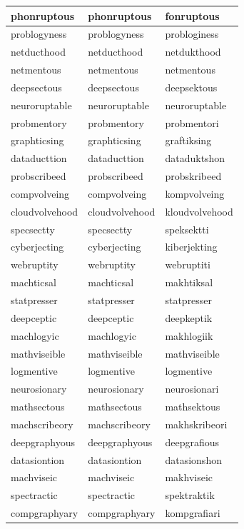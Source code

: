 \documentclass[10pt,twocolumn,letterpaper]{article}
\begin{document}
\begin{longtable}{|p{4cm}|p{4cm}|p{4cm}|}
phonruptous & phonruptous & fonruptous \\ \hline
problogyness & problogyness & probloginess \\ \hline
netducthood & netducthood & netdukthood \\ \hline
netmentous & netmentous & netmentous \\ \hline
deepsectous & deepsectous & deepsektous \\ \hline
neuroruptable & neuroruptable & neuroruptable \\ \hline
probmentory & probmentory & probmentori \\ \hline
graphticsing & graphticsing & graftiksing \\ \hline
dataducttion & dataducttion & dataduktshon \\ \hline
probscribeed & probscribeed & probskribeed \\ \hline
compvolveing & compvolveing & kompvolveing \\ \hline
cloudvolvehood & cloudvolvehood & kloudvolvehood \\ \hline
specsectty & specsectty & speksektti \\ \hline
cyberjecting & cyberjecting & kiberjekting \\ \hline
webruptity & webruptity & webruptiti \\ \hline
machticsal & machticsal & makhtiksal \\ \hline
statpresser & statpresser & statpresser \\ \hline
deepceptic & deepceptic & deepkeptik \\ \hline
machlogyic & machlogyic & makhlogiik \\ \hline
mathviseible & mathviseible & mathviseible \\ \hline
logmentive & logmentive & logmentive \\ \hline
neurosionary & neurosionary & neurosionari \\ \hline
mathsectous & mathsectous & mathsektous \\ \hline
machscribeory & machscribeory & makhskribeori \\ \hline
deepgraphyous & deepgraphyous & deepgrafious \\ \hline
datasiontion & datasiontion & datasionshon \\ \hline
machviseic & machviseic & makhviseic \\ \hline
spectractic & spectractic & spektraktik \\ \hline
compgraphyary & compgraphyary & kompgrafiari \\ \hline

\end{longtable}
\end{document}
